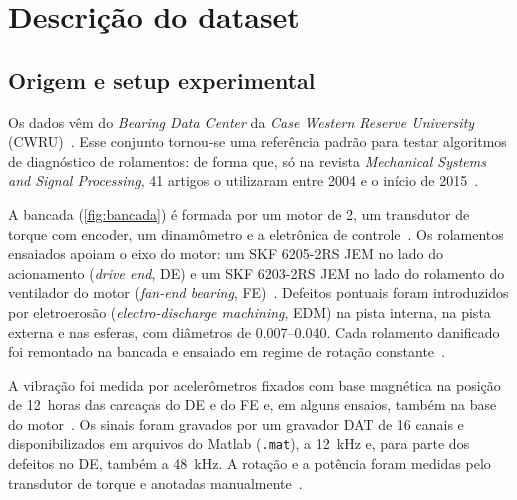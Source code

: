 %
\chapter{Descrição do dataset}
\label{cap:dataset}

\section{Origem e setup experimental}
\label{sec:setup}

Os dados vêm do \emph{Bearing Data Center} da \emph{Case Western Reserve University} (CWRU)~\cite{cwru}. Esse conjunto tornou-se uma referência padrão para testar algoritmos de diagnóstico de rolamentos: de forma que, só na revista \emph{Mechanical Systems and Signal Processing}, 41 artigos o utilizaram entre 2004 e o início de 2015~\cite{smith2015}.

A bancada (\autoref{fig:bancada}) é formada por um motor de \SI{2}{\hp}, um transdutor de torque com encoder, um dinamômetro e a eletrônica de controle~\cite{cwru}. Os rolamentos ensaiados apoiam o eixo do motor: um SKF 6205-2RS JEM no lado do acionamento (\emph{drive end}, DE) e um SKF 6203-2RS JEM no lado do rolamento do ventilador do motor (\emph{fan-end bearing}, FE)~\cite{smith2015}. Defeitos pontuais foram introduzidos por eletroerosão (\emph{electro-discharge machining}, EDM) na pista interna, na pista externa e nas esferas, com diâmetros de \SIrange{0.007}{0.040}{\inch}. Cada
rolamento danificado foi remontado na bancada e ensaiado em regime de rotação constante~\cite{cwru,smith2015}.

A vibração foi medida por acelerômetros fixados com base magnética na posição de 12~horas das carcaças do DE e do FE e, em alguns ensaios, também na base do motor~\cite{cwru}. Os sinais foram gravados por um gravador DAT de 16 canais e disponibilizados em arquivos do Matlab (\texttt{.mat}), a \SI{12}{\kilo\hertz} e, para parte dos defeitos no DE, também a \SI{48}{\kilo\hertz}. A rotação e a potência foram medidas pelo transdutor de
torque e anotadas manualmente~\cite{cwru}.


